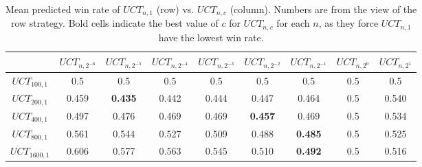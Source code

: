 \begin{table}
 \begin{adjustwidth}{-.5in}{-.5in}
  \caption{Mean predicted win rate of $UCT_{n, 1}$ (row) vs. $UCT_{n, c}$ (column). Numbers are from the view of the row strategy. Bold cells indicate the best value of $c$ for $UCT_{n,c}$ for each $n$, as they force $UCT_{n,1}$ have the lowest win rate.}
  \label{tab:param_set}
  \centering
  \begin{tabular}{ccccccccc}
    \toprule
      & $UCT_{n,2^{-6}}$ & $UCT_{n, 2^{-5}}$ & $UCT_{n, 2^{-4}}$ & $UCT_{n, 2^{-3}}$ & $UCT_{n, 2^{-2}}$ & $UCT_{n, 2^{-1}}$ & $UCT_{n, 2^0}$ & $UCT_{n, 2^1}$\\
    \midrule
    $UCT_{100, 1}$ & 0.5 & 0.5 & 0.5 & 0.5 & 0.5 & 0.5 & 0.5 & 0.5\\
    $UCT_{200, 1}$ & 0.459 & \textbf{0.435} & 0.442 & 0.444 & 0.447 & 0.464 & 0.5 & 0.540 \\
    $UCT_{400, 1}$ & 0.497 & 0.476 & 0.469 & 0.469 & \textbf{0.457} & 0.469 & 0.5 & 0.534 \\
    $UCT_{800, 1}$ & 0.561 & 0.544 & 0.527 & 0.509 & 0.488 & \textbf{0.485} & 0.5 & 0.525 \\
    $UCT_{1600, 1}$ & 0.606 & 0.577 & 0.563 & 0.545 & 0.510 & \textbf{0.492} & 0.5 & 0.516 \\
  \bottomrule
	\end{tabular}
  \end{adjustwidth}
\end{table}


